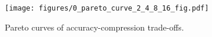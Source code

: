 \begin{figure}[t!]
    \centering
    \texttt{[image: figures/0\_pareto\_curve\_2\_4\_8\_16\_fig.pdf]}
    \caption{\small Pareto curves of accuracy-compression trade-offs.}
    \label{fig:0_pareto_curve_2_4_8_16}
\end{figure}
